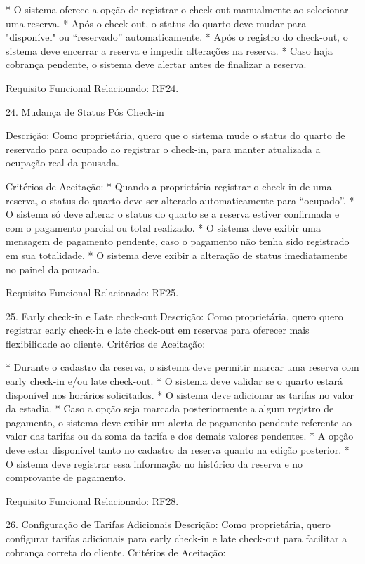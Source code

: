 * O sistema oferece a opção de registrar o check-out manualmente ao selecionar uma reserva.
* Após o check-out, o status do quarto deve mudar para "disponível" ou “reservado” automaticamente.
* Após o registro do check-out, o sistema deve encerrar a reserva e impedir alterações na reserva.
* Caso haja cobrança pendente, o sistema deve alertar antes de finalizar a reserva.


Requisito Funcional Relacionado: RF24.


24.  Mudança de Status Pós Check-in


Descrição: Como proprietária, quero que o sistema mude o status do quarto de reservado para ocupado ao registrar o check-in, para manter atualizada a ocupação real da pousada.


Critérios de Aceitação:
* Quando a proprietária registrar o check-in de uma reserva, o status do quarto deve ser alterado automaticamente para “ocupado”.
* O sistema só deve alterar o status do quarto se a reserva estiver confirmada e com o pagamento parcial ou total realizado.
* O sistema deve exibir uma mensagem de pagamento pendente, caso o pagamento não tenha sido registrado em sua totalidade.
* O sistema deve exibir a alteração de status imediatamente no painel da pousada.


Requisito Funcional Relacionado: RF25.


25. Early check-in e Late check-out
Descrição: Como proprietária, quero quero registrar early check-in e late check-out em reservas para oferecer mais flexibilidade ao cliente.  
Critérios de Aceitação:

* Durante o cadastro da reserva, o sistema deve permitir marcar uma reserva com early check-in e/ou late check-out.
* O sistema deve validar se o quarto estará disponível nos horários solicitados.
* O sistema deve adicionar as tarifas no valor da estadia.
* Caso a opção seja marcada posteriormente a algum registro de pagamento, o sistema deve exibir um alerta de pagamento pendente referente ao valor das tarifas ou da soma da tarifa e dos demais valores pendentes.
* A opção deve estar disponível tanto no cadastro da reserva quanto na edição posterior.
* O sistema deve registrar essa informação no histórico da reserva e no comprovante de pagamento.


Requisito Funcional Relacionado: RF28.




26. Configuração de Tarifas Adicionais
Descrição: Como proprietária, quero configurar tarifas adicionais para early check-in e late check-out para facilitar a cobrança correta do cliente.
Critérios de Aceitação:


